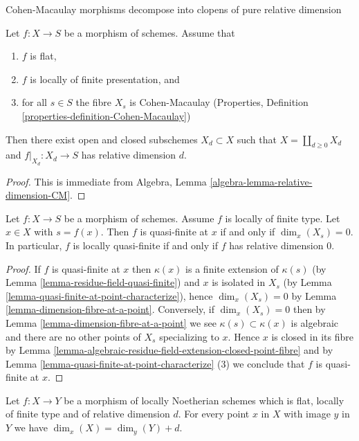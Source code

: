 \begin{lemma}
\label{lemma-flat-finite-presentation-CM-fibres-relative-dimension}
\begin{slogan}
Cohen-Macaulay morphisms decompose into clopens of pure relative dimension
\end{slogan}
Let $f : X \to S$ be a morphism of schemes.
Assume that
\begin{enumerate}
\item $f$ is flat,
\item $f$ is locally of finite presentation, and
\item for all $s \in S$ the fibre $X_s$ is Cohen-Macaulay
(Properties, Definition \ref{properties-definition-Cohen-Macaulay})
\end{enumerate}
Then there exist open and closed subschemes $X_d \subset X$
such that $X = \coprod_{d \geq 0} X_d$ and $f|_{X_d} : X_d \to S$
has relative dimension $d$.
\end{lemma}

\begin{proof}
This is immediate from
Algebra, Lemma
\ref{algebra-lemma-relative-dimension-CM}.
\end{proof}

\begin{lemma}
\label{lemma-locally-quasi-finite-rel-dimension-0}
Let $f : X \to S$ be a morphism of schemes.
Assume $f$ is locally of finite type.
Let $x \in X$ with $s = f(x)$.
Then $f$ is quasi-finite at $x$ if and only if $\dim_x(X_s) = 0$.
In particular, $f$ is locally quasi-finite if and only if $f$ has relative
dimension $0$.
\end{lemma}

\begin{proof}
If $f$ is quasi-finite at $x$ then $\kappa(x)$ is a finite extension of
$\kappa(s)$ (by
Lemma \ref{lemma-residue-field-quasi-finite})
and $x$ is isolated in $X_s$ (by
Lemma \ref{lemma-quasi-finite-at-point-characterize}),
hence $\dim_x(X_s) = 0$ by
Lemma \ref{lemma-dimension-fibre-at-a-point}.
Conversely, if $\dim_x(X_s) = 0$ then by
Lemma \ref{lemma-dimension-fibre-at-a-point}
we see $\kappa(s) \subset \kappa(x)$ is algebraic and
there are no other points of $X_s$ specializing to $x$.
Hence $x$ is closed in its fibre by
Lemma \ref{lemma-algebraic-residue-field-extension-closed-point-fibre}
and by
Lemma \ref{lemma-quasi-finite-at-point-characterize} (3)
we conclude that $f$ is quasi-finite at $x$.
\end{proof}

\begin{lemma}
\label{lemma-rel-dimension-dimension}
Let $f : X \to Y$ be a morphism of locally Noetherian schemes
which is flat, locally of finite type and of relative dimension $d$.
For every point $x$ in $X$ with image
$y$ in $Y$ we have $\dim_x(X) = \dim_y(Y) + d$.
\end{lemma}

